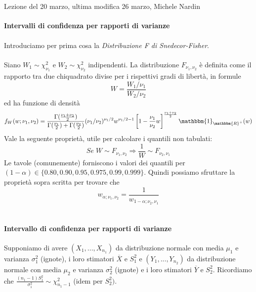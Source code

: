 \\ \\
Lezione del 20 marzo, ultima modifica 26 marzo, Michele Nardin
\\ \\
\noindent\textbf{Intervalli di confidenza per rapporti di varianze}\\ \\

Introduciamo per prima cosa la \textit{Distribuzione F di Snedecor-Fisher}.
\\ \\
Siano $W_1 \sim \chi^2_{\nu_1}$ e $W_2 \sim \chi^2_{\nu_2}$ indipendenti.
La distribuzione $F_{\nu_1,\nu_2}$ è definita come il rapporto tra due chiquadrato divise per i
rispettivi gradi di libertà, in formule $$W=\frac{W_1/\nu_{1}}{W_2/\nu_{2}}$$ ed ha funzione di densità $$f_W(w;\nu_1,\nu_2)=\frac{\Gamma(\frac{\nu_1 + \nu_2}{2})}{\Gamma(\frac{\nu_1}{2})+\Gamma(\frac{\nu_2}{2})} (\nu_1 / \nu_2)^{\nu_1 / 2} w^{\nu_1 / 2 - 1} \left[ 1 - \frac{\nu_1}{\nu_2} w  \right]^{\frac{\nu_1 + \nu_2}{2}} \mathbbm{1}_{\mathbbm{R}^+} (w)$$
Vale la seguente proprietà, utile per calcolare i quantili non tabulati:
$$Se \; W \sim F_{\nu_1,\nu_2} \Rightarrow \frac{1}{W} \sim F_{\nu_2,\nu_1}$$
Le tavole (comunemente) forniscono i valori dei quantili per $(1-\alpha) \in \{0.80, 0.90, 0.95, 0.975, 0.99, 0.999\}$. Quindi possiamo sfruttare la proprietà sopra scritta per trovare che $$w_{\alpha;\nu_1,\nu_2}=\frac{1}{w_{1-\alpha;\nu_2,\nu_1}}$$
\\ \\
\textbf{Intervallo di confidenza per rapporti di varianze}
\\ \\
 Supponiamo di avere $(X_1,...,X_{n_1})$ da distribuzione normale con media $\mu_1$ e varianza $\sigma_1^2$ (ignote), i loro stimatori $\overline{X}$ e $S^2_1$ e
 $(Y_1,...,Y_{n_2})$ da distribuzione normale con media $\mu_2$ e varianza $\sigma_2^2$ (ignote) e i loro stimatori $\overline{Y}$ e $S^2_2$.
 Ricordiamo che $\frac{(n_1-1)S^2_1}{\sigma^2_1} \sim \chi^2_{n_1 - 1}$ (idem per $S^2_2)$.
 
